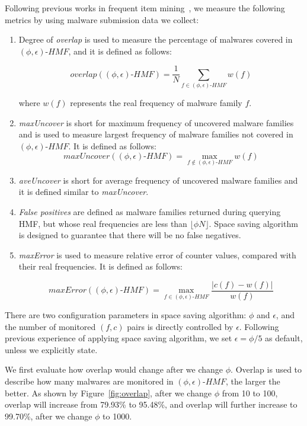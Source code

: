 Following previous works in frequent item mining~\cite{hot-calling-context}, 
we measure the following metrics by using malware submission data we collect:

\begin{enumerate}

\item 
Degree of \textit{overlap} is used to measure the percentage of malwares covered in $(\phi, \epsilon)\mbox{-}HMF$,
and it is defined as follows:

$$overlap((\phi, \epsilon)\mbox{-}HMF) = \dfrac{1}{N}\sum_{f \in (\phi, \epsilon)\mbox{-}HMF}w(f)$$

where $w(f)$ represents the real frequency of malware family $f$.  

\item 
\textit{maxUncover} is short for maximum frequency of uncovered malware families and 
is used 
to measure largest frequency of malware families not covered in $(\phi, \epsilon)\mbox{-}HMF$. 
It is defined as follows:
$$maxUncover((\phi, \epsilon)\mbox{-}HMF) = \max_{f \notin (\phi, \epsilon)\mbox{-}HMF}w(f)$$

\item 
\textit{aveUncover} is short for average frequency of uncovered malware families 
and it is defined similar to \textit{maxUncover}. 

\item 
\textit{False positives} are defined as malware families returned during querying HMF, 
but whose real frequencies are less than $\lfloor \phi N \rfloor$. 
Space saving algorithm is designed to guarantee that there will be no false negatives. 

\item 
\textit{maxError} is used to measure relative error of counter values, 
compared with their real frequencies.
It is defined as follows:

$$maxError((\phi, \epsilon)\mbox{-}HMF) = \max_{f \in (\phi, \epsilon)\mbox{-}HMF} \dfrac{\left|c(f) - w(f)\right|}{w(f)}$$


\end{enumerate}

There are two configuration parameters in space saving algorithm: $\phi$ and $\epsilon$, 
and the number of monitored $(f, c)$ pairs is directly controlled by $\epsilon$. 
Following previous experience of applying space saving algorithm, we set $\epsilon = \phi/5$ as default, 
unless we explicitly state.  

We first evaluate how overlap would change after we change $\phi$. 
Overlap is used to describe how many malwares are monitored in $(\phi, \epsilon)\mbox{-}HMF$, the larger the better. 
As shown by Figure~\ref{fig:overlap}, after we change $\phi$ from 10 to 100, 
overlap will increase from 79.93\% to 95.48\%, and overlap will further increase to 99.70\%, after we change $\phi$ to 1000. 

